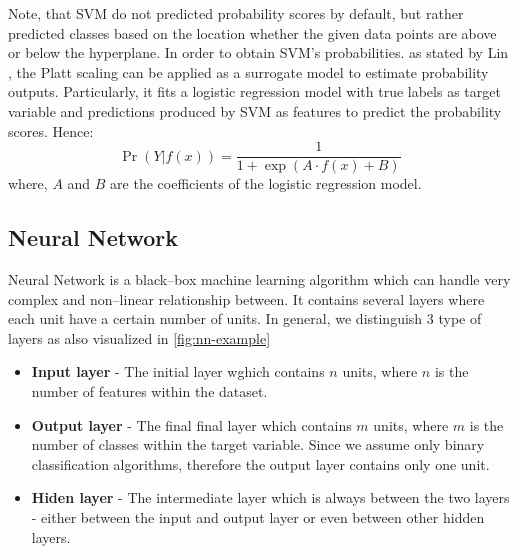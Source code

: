 Note, that SVM do not predicted probability scores by default, but rather predicted classes based on the location whether the given data points are above or below the hyperplane.
In order to obtain SVM's probabilities. as stated by Lin \citep{lin2007note}, the Platt scaling \citep{platt1999probabilistic} can be applied as a surrogate model to estimate probability outputs. Particularly, it fits a logistic regression model with true labels as target variable and predictions produced by SVM as features to predict the probability scores.
Hence:
\begin{equation}
    \operatorname{Pr}\left(Y | f(x) \right) = \frac{1}{1 + \exp\left(A \cdot f(x) + B \right)} 
\end{equation}
where, $A$ and $B$ are the coefficients of the logistic regression model.

\subsection{Neural Network}
Neural Network is a black--box machine learning algorithm which can handle very complex and non--linear relationship between. It contains several layers where each unit have a certain number of units. In general, we distinguish 3 type of layers as also visualized in \autoref{fig:nn-example}
\begin{itemize}\setlength\itemsep{0em}
    \item \textbf{Input layer} - The initial layer wghich contains $n$ units, where $n$ is the number of features within the dataset.
    \item \textbf{Output layer} - The final final layer which contains $m$ units, where $m$ is the number of classes within the target variable. Since we assume only binary classification algorithms, therefore the output layer contains only one unit.
    \item \textbf{Hiden layer} - The intermediate layer which is always between the two layers - either between the input and output layer or even between other hidden layers.
    \end{itemize}

